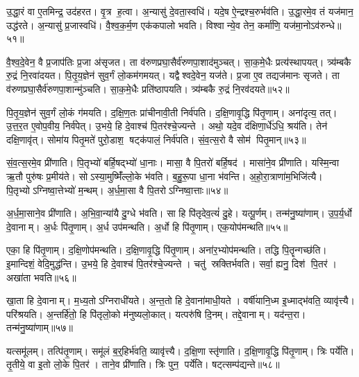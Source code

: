 उ॒द्धा॒रं वा ए॒तमिन्द्र॒ उद॑हरत।
वृ॒त्र ह॒त्वा।
अ॒न्यासु॑ दे॒वता॒स्वधि॑।
यदे॒ष ऐ॒न्द्रश्च॒रुर्भव॑ति।
उ॒द्धा॒रमे॒व तं यज॑मान॒ उद्ध॑रते।
अ॒न्यासु॑ प्र॒जास्वधि॑।
वै॒श्व॒क॒र्म॒ण एक॑कपालो भवति।
विश्वान्ये॒व तेन॒ कर्मा॑णि॒ यज॑मा॒नोऽव॑रुन्धे॥५१॥\anuvakamend[ऋ॒द्ध्य॒ते॒ऽभ्य॑ञ्जते जुहोति वृणामहै भवत्य॒ष्टौ च॑]

वै॒श्व॒दे॒वेन॒ वै प्र॒जाप॑तिः प्र॒जा अ॑सृजत।
ता व॑रुणप्रघा॒सैर्व॑रुण\-पा॒शाद॑मुञ्चत्।
सा॒क॒मे॒धैः प्रत्य॑स्थापयत्।
त्र्य॑म्बकै रु॒द्रं नि॒रवा॑दयत।
पि॒तृ॒य॒ज्ञेन॑ सुव॒र्गं लो॒कम॑गमयत्।
यद्वैश्वदे॒वेन॒ यज॑ते।
प्र॒जा ए॒व तद्यज॑मानः सृजते।
ता व॑रुणप्रघा॒सैर्व॑रुणपा॒शान्मु॑ञ्चति।
सा॒क॒मे॒धैः प्रति॑ष्ठापयति।
त्र्य॑म्बकै रु॒द्रं नि॒रव॑दयते॥५२॥

पि॒तृ॒य॒ज्ञेन॑ सुव॒र्गं लो॒कं ग॑मयति।
द॒क्षि॒ण॒तः प्रा॑चीनावी॒ती निर्व॑पति।
द॒क्षि॒णावृ॒द्धि पि॑तृ॒णाम्।
अना॑दृत्य॒ तत्।
उ॒त्त॒र॒त ए॒वोप॒वीय॒ निर्व॑पेत्।
उ॒भये॒ हि दे॒वाश्च॑ पि॒तर॑श्चे॒ज्यन्ते।
अथो॒ यदे॒व द॑क्षिणा॒र्धे॑ऽधि॒ श्रय॑ति।
तेन॑ दक्षि॒णावृ॑त्।
सोमा॑य पितृ॒मते॑ पुरो॒डाश॒ षट्क॑पालं॒ निर्व॑पति।
सं॒व॒त्स॒रो वै सोम॑ पितृ॒मान्॥५३॥

सं॒व॒त्स॒रमे॒व प्री॑णाति।
पि॒तृभ्यो॑ बर्\mbox{}हि॒षद्भ्यो॑ धा॒नाः।
मासा॒ वै पि॒तरो॑ बर्\mbox{}हि॒षद॑।
मासा॑ने॒व प्री॑णाति।
यस्मि॒न्वा ऋ॒तौ पुरु॑षः प्र॒मीय॑ते।
सोऽस्या॒मुष्मिँ॑ल्लो॒के भ॑वति।
ब॒हु॒रू॒पा धा॒ना भ॑वन्ति।
अ॒हो॒रा॒त्राणा॑म॒भिजि॑त्यै।
पि॒तृभ्योऽग्निष्वा॒त्तेभ्यो॑ म॒न्थम्।
अ॒र्ध॒मा॒सा वै पि॒तरोऽग्निष्वा॒त्ताः॥५४॥

अ॒र्ध॒मा॒साने॒व प्री॑णाति।
अ॒भि॒वा॒न्या॑यै दु॒ग्धे भ॑वति।
सा हि पि॑तृदेव॒त्यं॑ दु॒हे।
यत्पू॒र्णम्।
तन्म॑नु॒ष्या॑णाम्।
उ॒प॒र्य॒र्धो दे॒वानाम्।
अ॒र्धः पि॑तृ॒णाम्।
अ॒र्ध उप॑मन्थति।
अ॒र्धो हि पि॑तृ॒णाम्।
एक॒योप॑मन्थति॥५५॥

एका॒ हि पि॑तृ॒णाम्।
द॒क्षि॒णोप॑मन्थति।
द॒क्षि॒णावृ॒द्धि पि॑तृ॒णाम्।
अना॑र॒भ्योप॑मन्थति।
तद्धि पि॒तॄन्गच्छ॑ति।
इ॒मान्दिशं॒ वेदि॒मुद्ध॑न्ति।
उ॒भये॒ हि दे॒वाश्च॑ पि॒तर॑श्चे॒ज्यन्ते।
चतु॑ स्रक्तिर्भवति।
सर्वा॒ ह्यनु॒ दिश॑ पि॒तर॑।
अखा॑ता भवति॥५६॥

खा॒ता हि दे॒वानाम्।
म॒ध्य॒तोऽग्निराधी॑यते।
अ॒न्त॒तो हि दे॒वाना॑माधी॒यते।
वर्\mbox{}षी॑यानि॒ध्म इ॒ध्माद्भ॑वति॒ व्यावृ॑त्त्यै।
परि॑श्रयति।
अ॒न्तर्\mbox{}हि॑तो॒ हि पि॑तृलो॒को म॑नुष्यलो॒कात्।
यत्परु॑षि दि॒नम्।
तद्दे॒वानाम्।
यद॑न्त॒रा।
तन्म॑नु॒ष्या॑णाम्॥५७॥

यत्समू॑लम्।
तत्पि॑तृ॒णाम्।
समू॑लं ब॒र्॒हिर्भ॑वति॒ व्यावृ॑त्त्यै।
द॒क्षि॒णा स्तृ॑णाति।
द॒क्षि॒णावृ॒द्धि पि॑तृ॒णाम्।
त्रिः पर्ये॑ति।
तृ॒तीये॒ वा इ॒तो लो॒के पि॒तर॑।
ताने॒व प्री॑णाति।
त्रिः पुन॒ पर्ये॑ति।
षट्त्सम्प॑द्यन्ते॥५८॥

